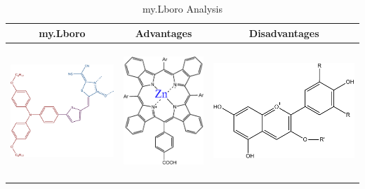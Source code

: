 \begin{table}[h!]
    \centering
    \begin{tabular}{ | c | c | c | }
      \hline
      my.Lboro & Advantages & Disadvantages \\ \hline
      \begin{minipage}{.3\textwidth}
        \includegraphics[width=\linewidth, height=50mm]{img/dye_scheme.pdf}
      \end{minipage}
      &
      \begin{minipage}{.3\textwidth}
            \includegraphics[width=\linewidth, height=50mm]{img/MetalOrganicDye.pdf}
      \end{minipage}
      & 
        \begin{minipage}{.3\textwidth}
            \includegraphics[width=\linewidth, height=50mm]{img/Antocyanin.pdf}
      \end{minipage}
      \\ \hline
    \end{tabular}
    \caption{my.Lboro Analysis}\label{tbl:myLboro}
  \end{table}




